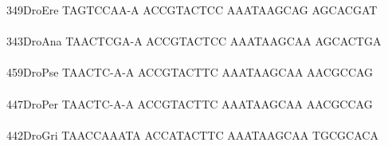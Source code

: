 \documentclass[11pt,twoside,reqno,a4paper]{article}
\begin{document}
{349\hspace*{1\charwidth}DroEre	TAGTCCAA-A	ACCGTACTCC	AAATAAGCAG	AGCACGAT\\
\hspace*{4\charwidth}\hspace*{7\charwidth}\hspace*{1\charwidth}\hspace*{1\charwidth}\hspace*{1\charwidth}\\
343\hspace*{1\charwidth}DroAna	TAACTCGA-A	ACCGTACTCC	AAATAAGCAA	AGCACTGA\\
\hspace*{4\charwidth}\hspace*{7\charwidth}\hspace*{1\charwidth}\hspace*{1\charwidth}\hspace*{1\charwidth}\\
459\hspace*{1\charwidth}DroPse	TAACTC-A-A	ACCGTACTTC	AAATAAGCAA	AACGCCAG\\
\hspace*{4\charwidth}\hspace*{7\charwidth}\hspace*{1\charwidth}\hspace*{1\charwidth}\hspace*{1\charwidth}\\
447\hspace*{1\charwidth}DroPer	TAACTC-A-A	ACCGTACTTC	AAATAAGCAA	AACGCCAG\\
\hspace*{4\charwidth}\hspace*{7\charwidth}\hspace*{1\charwidth}\hspace*{1\charwidth}\hspace*{1\charwidth}\\
442\hspace*{1\charwidth}DroGri	TAACCAAATA	ACCATACTTC	AAATAAGCAA	TGCGCACA\\
\hspace*{4\charwidth}\hspace*{7\charwidth}\hspace*{1\charwidth}\hspace*{1\charwidth}\hspace*{1\charwidth}\\
\\
}
\end{document}
